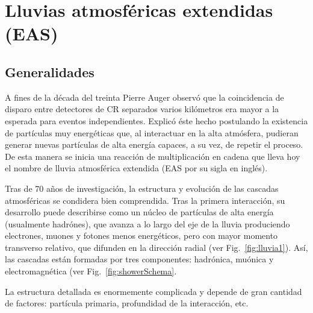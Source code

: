 \chapter{Lluvias atmosf\'ericas extendidas (EAS)}
\label{ch:easAuger}

\section{Generalidades}

A fines de la década del treinta Pierre Auger observó que la coincidencia de disparo entre detectores de CR separados varios kilómetros era mayor a la esperada para eventos independientes. Explicó éste hecho postulando la existencia de partículas muy energéticas que, al interactuar  en la alta atmósfera, pudieran generar nuevas partículas de alta energía capaces, a su vez, de repetir el proceso. De esta manera se inicia una reacción de multiplicación en cadena que lleva hoy el nombre de lluvia atmosférica extendida (EAS por su sigla en inglés). 

Tras de 70 años de investigación, la estructura y evolución de las cascadas atmosféricas se condidera bien comprendida.
Tras la primera interacción, su desarrollo puede describirse como un núcleo de partículas de alta energía (usualmente hadrónes), que avanza a lo largo del eje de la lluvia produciendo electrones, muones y fotones menos energéticos, pero con mayor momento transverso relativo, que difunden en la dirección radial (ver Fig.~\ref{fig:lluvia1}). Así, las cascadas están formadas por tres componentes: hadrónica, muónica y electromagnética (ver Fig.~\ref{fig:showerSchema}.

La estructura detallada es enormemente complicada y depende de gran cantidad de factores: partícula primaria, profundidad de la interacción, etc.

